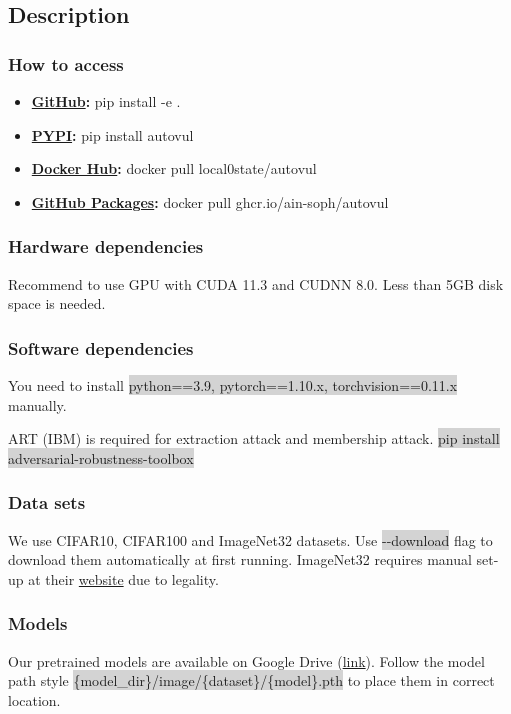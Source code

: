 \documentclass[letterpaper,twocolumn,10pt]{article}
\begin{document}
{%
\subsection{Description}

\subsubsection{How to access}

{\small
\begin{itemize}
    \item {\bf \href{https://github.com/ain-soph/autovul}{GitHub}: } pip install -e .
    \item {\bf \href{https://pypi.org/project/autovul/}{PYPI}: } pip install autovul
    \item {\bf \href{https://hub.docker.com/r/local0state/autovul}{Docker Hub}: } docker pull local0state/autovul
    \item {\bf \href{https://github.com/ain-soph/autovul/pkgs/container/autovul}{GitHub Packages}: } docker pull ghcr.io/ain-soph/autovul
\end{itemize}

\subsubsection{Hardware dependencies}
Recommend to use GPU with CUDA 11.3 and CUDNN 8.0. Less than 5GB disk space is needed.
\subsubsection{Software dependencies}
You need to install \colorbox{lightgray}{python==3.9, pytorch==1.10.x, torchvision==0.11.x} manually.

ART (IBM) is required for extraction attack and membership attack. \colorbox{lightgray}{pip install adversarial-robustness-toolbox}

\subsubsection{Data sets}
We use CIFAR10, CIFAR100 and ImageNet32 datasets. Use \colorbox{lightgray}{-{}-download} flag to download them automatically at first running. ImageNet32 requires manual set-up at their \href{https://image-net.org/download-images.php}{website} due to legality.
\subsubsection{Models}
Our pretrained models are available on Google Drive (\href{https://drive.google.com/drive/folders/1GrjEO89hYrdLhDMkBLC26jp1C7BwIKwm?usp=sharing}{link}). Follow the model path style \colorbox{lightgray}{\{model\_dir\}/image/\{dataset\}/\{model\}.pth} to place them in correct location.

}}
\end{document}
